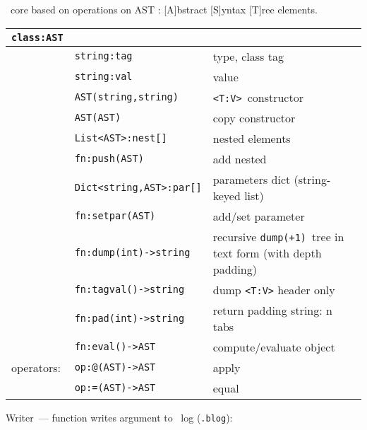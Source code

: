 \label{ast}\secdown

\bi\ core based on operations on AST :
[A]bstract [S]yntax [T]ree elements.

\bigskip
\begin{tabular}{l l l}
\verb|class:AST| &&\\
\hline
& \verb|string:tag| & type, class tag \\
& \verb|string:val| & value \\
\hline
& \verb|AST(string,string)| & \verb|<T:V>|\ constructor \\
& \verb|AST(AST)| & copy constructor \\
\hline
& \verb|List<AST>:nest[]| & nested elements \\
& \verb|fn:push(AST)| & add nested \\
\hline
& \verb|Dict<string,AST>:par[]| & parameters dict (string-keyed list) \\
& \verb|fn:setpar(AST)| & add/set parameter \\
\hline
& \verb|fn:dump(int)->string| & recursive \verb|dump(+1)|\ tree in text
form (with depth padding) \\
& \verb|fn:tagval()->string| & dump \verb|<T:V>| header only \\
& \verb|fn:pad(int)->string| & return padding string: n tabs \\
\hline
& \verb|fn:eval()->AST| & compute/evaluate object \\
operators: & \verb|op:@(AST)->AST| & apply \\
& \verb|op:=(AST)->AST| & equal \\
\end{tabular} 



Writer\ --- function writes argument to \bi\ log (\verb|.blog|):



\secup